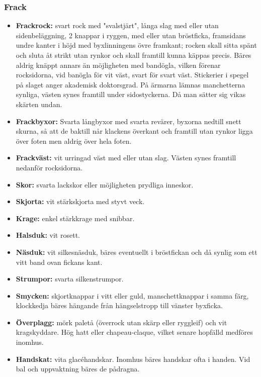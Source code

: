     \subsubsection{\textbf{Frack}}
    \begin{itemize}
    
    \item[]\textbf{Frackrock:} svart rock med "svalstjärt", långa slag med eller utan sidenbeläggning, 2 knappar i ryggen, med eller utan bröstficka, framsidans undre kanter i höjd med byxlinningens övre framkant; rocken skall sitta spänt och sluta åt strikt utan rynkor och skall framtill kunna käppas precis. Bäres aldrig knäppt annars än möjligheten med bandögla, vilken förenar rocksidorna, vid banögla för vit väst, svart för svart väst. Stickerier i spegel på slaget anger akademisk doktorsgrad. På ärmarna lämnas manchetterna synliga, västen synes framtill under sidostyckerna. Då man sätter sig vikas skärten undan.

    \item[]\textbf{Frackbyxor:} Svarta långbyxor med svarta revärer, byxorna nedtill snett skurna, så att de baktill når klackens överkant och framtill utan rynkor ligga över foten men aldrig över hela foten.

    \item[]\textbf{Frackväst:} vit urringad väst med eller utan slag. Västen synes framtill nedanför rocksidorna.

    \item[]\textbf{Skor:} svarta lackskor eller möjligheten prydliga inneskor.
    
    \item[]\textbf{Skjorta:} vit stärkskjorta med styvt veck.

    \item[]\textbf{Krage:} enkel stärkkrage med snibbar.

    \item[]\textbf{Halsduk:} vit rosett.

    \item[]\textbf{Näsduk:} vit silkesnäsduk, bäres eventuellt i bröstfickan och då synlig som ett vitt band ovan fickans kant.

    \item[]\textbf{Strumpor:} svarta silkenstrumpor.

    \item[]\textbf{Smycken:} skjortknappar i vitt eller guld, manschettknappar i samma färg, klockkedja bäres hängande från hängselstropp till vänster byxficka.

    \item[]\textbf{Överplagg:} mörk paletå (överrock utan skärp eller ryggleif) och vit kragskyddare. Hög hatt eller chapeau-claque, vilket senare hopfälld medföres inomhus.

    \item[]\textbf{Handskat:} vita glacéhandskar. Inomhus bäres handskar ofta i handen. Vid bal och uppvaktning bäres de pådragna.

    \end{itemize}

